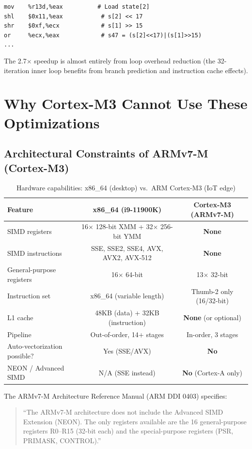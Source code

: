 \documentclass[11pt,a4paper]{article}
\begin{document}
\begin{lstlisting}
mov    %r13d,%eax          # Load state[2]
shl    $0x11,%eax           # s[2] << 17
shr    $0xf,%ecx            # s[1] >> 15
or     %ecx,%eax            # s47 = (s[2]<<17)|(s[1]>>15)
...
\end{lstlisting}

The 2.7$\times$ speedup is almost entirely from loop overhead reduction (the 32-iteration inner loop benefits from branch prediction and instruction cache effects).

\section{Why Cortex-M3 Cannot Use These Optimizations}

\subsection{Architectural Constraints of ARMv7-M (Cortex-M3)}

\begin{table}[H]
\centering
\caption{Hardware capabilities: x86\_64 (desktop) vs.\ ARM Cortex-M3 (IoT edge)}
\label{tab:arch}
\begin{tabular}{lcc}
\toprule
\textbf{Feature} & \textbf{x86\_64 (i9-11900K)} & \textbf{Cortex-M3 (ARMv7-M)} \\
\midrule
SIMD registers & 16$\times$ 128-bit XMM + 32$\times$ 256-bit YMM & \textbf{None} \\
SIMD instructions & SSE, SSE2, SSE4, AVX, AVX2, AVX-512 & \textbf{None} \\
General-purpose registers & 16$\times$ 64-bit & 13$\times$ 32-bit \\
Instruction set & x86\_64 (variable length) & Thumb-2 only (16/32-bit) \\
L1 cache & 48KB (data) + 32KB (instruction) & \textbf{None} (or optional) \\
Pipeline & Out-of-order, 14+ stages & In-order, 3 stages \\
Auto-vectorization possible? & Yes (SSE/AVX) & \textbf{No} \\
NEON / Advanced SIMD & N/A (SSE instead) & \textbf{No} (Cortex-A only) \\
\bottomrule
\end{tabular}
\end{table}

The ARMv7-M Architecture Reference Manual (ARM DDI 0403) specifies:
\begin{quote}
``The ARMv7-M architecture does not include the Advanced SIMD Extension (NEON). The only registers available are the 16 general-purpose registers R0--R15 (32-bit each) and the special-purpose registers (PSR, PRIMASK, CONTROL).''
\end{quote}
\end{document}
